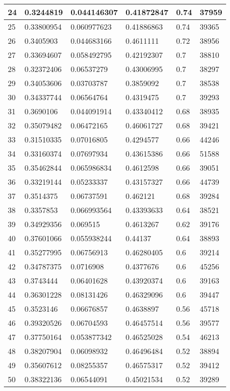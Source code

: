 \begin{longtable}{|l|l|l|l|l|l|}
24 & 0.3244819 & 0.044146307 & 0.41872847 & 0.74 & 37959 \\ \hline 
25 & 0.33800954 & 0.060977623 & 0.41886863 & 0.74 & 39365 \\ \hline 
26 & 0.3405903 & 0.044683166 & 0.4611111 & 0.72 & 38956 \\ \hline 
27 & 0.33694607 & 0.058492795 & 0.42192307 & 0.7 & 38810 \\ \hline 
28 & 0.32372406 & 0.06537279 & 0.43006995 & 0.7 & 38297 \\ \hline 
29 & 0.34053606 & 0.03703787 & 0.3859092 & 0.7 & 38538 \\ \hline 
30 & 0.34337744 & 0.06564764 & 0.4319475 & 0.7 & 39293 \\ \hline 
31 & 0.3690106 & 0.044091914 & 0.43340412 & 0.68 & 38935 \\ \hline 
32 & 0.35079482 & 0.06472165 & 0.46061727 & 0.68 & 39421 \\ \hline 
33 & 0.31510335 & 0.07016805 & 0.4294577 & 0.66 & 44246 \\ \hline 
34 & 0.33160374 & 0.07697934 & 0.43615386 & 0.66 & 51588 \\ \hline 
35 & 0.35462844 & 0.065986834 & 0.4612598 & 0.66 & 39051 \\ \hline 
36 & 0.33219144 & 0.05233337 & 0.43157327 & 0.66 & 44739 \\ \hline 
37 & 0.3514375 & 0.06737591 & 0.462121 & 0.68 & 39284 \\ \hline 
38 & 0.3357853 & 0.066993564 & 0.43393633 & 0.64 & 38521 \\ \hline 
39 & 0.34929356 & 0.069515 & 0.4613267 & 0.62 & 39176 \\ \hline 
40 & 0.37601066 & 0.055938244 & 0.44137 & 0.64 & 38893 \\ \hline 
41 & 0.35277995 & 0.06756913 & 0.46280405 & 0.6 & 39214 \\ \hline 
42 & 0.34787375 & 0.0716908 & 0.4377676 & 0.6 & 45256 \\ \hline 
43 & 0.3743444 & 0.06401628 & 0.43920374 & 0.6 & 39163 \\ \hline 
44 & 0.36301228 & 0.08131426 & 0.46329096 & 0.6 & 39447 \\ \hline 
45 & 0.3523146 & 0.06676857 & 0.4638897 & 0.56 & 45718 \\ \hline 
46 & 0.39320526 & 0.06704593 & 0.46457514 & 0.56 & 39577 \\ \hline 
47 & 0.37750164 & 0.053877342 & 0.46525028 & 0.54 & 46213 \\ \hline 
48 & 0.38207904 & 0.06098932 & 0.46496484 & 0.52 & 38894 \\ \hline 
49 & 0.35607612 & 0.08255357 & 0.46575317 & 0.52 & 39412 \\ \hline 
50 & 0.38322136 & 0.06544091 & 0.45021534 & 0.52 & 39289 \\ \hline 
\end{longtable}